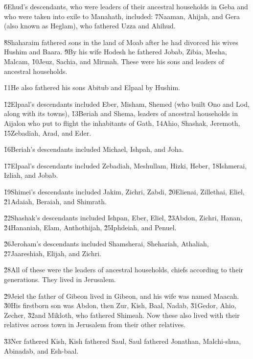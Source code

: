 \v{6}Ehud's descendants, who were leaders of their ancestral households in Geba and who were taken into exile to Manahath, included: \v{7}Naaman, Ahijah, and Gera (also known as Heglam), who fathered Uzza and Ahihud.

\v{8}Shaharaim fathered sons in the land of Moab after he had divorced his wives Hushim and Baara. \v{9}By his wife Hodesh he fathered Jobab, Zibia, Mesha, Malcam, \v{10}Jeuz, Sachia, and Mirmah. These were his sons and leaders of ancestral households.

\v{11}He also fathered his sons Abitub and Elpaal by Hushim.

\v{12}Elpaal's descendants included Eber, Misham, Shemed (who built Ono and Lod, along with its towns), \v{13}Beriah and Shema, leaders of ancestral households in Aijalon who put to flight the inhabitants of Gath, \v{14}Ahio, Shashak, Jeremoth, \v{15}Zebadiah, Arad, and Eder.

\v{16}Beriah's descendants included Michael, Ishpah, and Joha.

\v{17}Elpaal's descendants included Zebadiah, Meshullam, Hizki, Heber, \v{18}Ishmerai, Izliah, and Jobab.

\v{19}Shimei's descendants included Jakim, Zichri, Zabdi, \v{20}Elienai, Zillethai, Eliel, \v{21}Adaiah, Beraiah, and Shimrath.

\v{22}Shashak's descendants included Ishpan, Eber, Eliel, \v{23}Abdon, Zichri, Hanan, \v{24}Hananiah, Elam, Anthothijah, \v{25}Iphdeiah, and Penuel.

\v{26}Jeroham's descendants included Shamsherai, Shehariah, Athaliah, \v{27}Jaareshiah, Elijah, and Zichri.

\v{28}All of these were the leaders of ancestral households, chiefs according to their generations. They lived in Jerusalem.

\v{29}Jeiel the father of Gibeon lived in Gibeon, and his wife was named Maacah. \v{30}His firstborn son was Abdon, then Zur, Kish, Baal, Nadab, \v{31}Gedor, Ahio, Zecher, \v{32}and Mikloth, who fathered Shimeah. Now these also lived with their relatives across town in Jerusalem from their other relatives.

\v{33}Ner fathered Kish, Kish fathered Saul, Saul fathered Jonathan, Malchi-shua, Abinadab, and Esh-baal.

